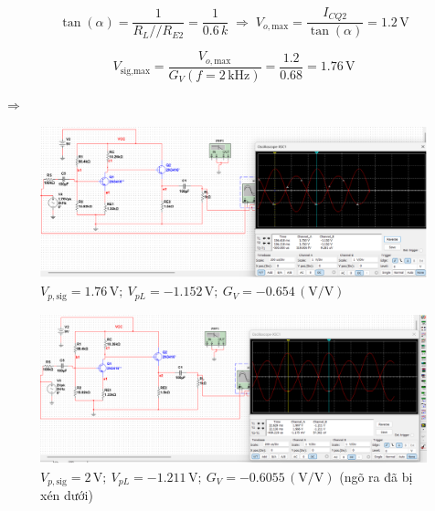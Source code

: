 \[
\tan(\alpha) = \frac{1}{R_L // R_{E2}} 
= \frac{1}{0.6\,k}
\;\Rightarrow\;
V_{o,\text{max}} = \frac{I_{CQ2}}{\tan(\alpha)} 
= 1.2\,\text{V}
\]

\[
V_{\text{sig,max}} = 
\frac{V_{o,\text{max}}}{G_V(f = 2\,\text{kHz})} 
= \frac{1.2}{0.68} 
= 1.76\,\text{V}
\]

$\Rightarrow$ 

\begin{figure}[H]
	\centering
	\includegraphics[width=.8\linewidth]{./my-chapters/my-images/Question9/c_1.png}
	\caption{\(V_{p,\text{sig}} = 1.76\,\text{V};\ 
		V_{pL} = -1.152\,\text{V};\ 
		G_V = -0.654\,(\text{V/V})\)}
\end{figure}

\begin{figure}[H]
	\centering
	\includegraphics[width=.8\linewidth]{./my-chapters/my-images/Question9/c_2.png}
	\caption{\(V_{p,\text{sig}} = 2\,\text{V};\ 
		V_{pL} = -1.211\,\text{V};\ 
		G_V = -0.6055\,(\text{V/V})\) 
		(ngõ ra đã bị xén dưới)}
\end{figure}


